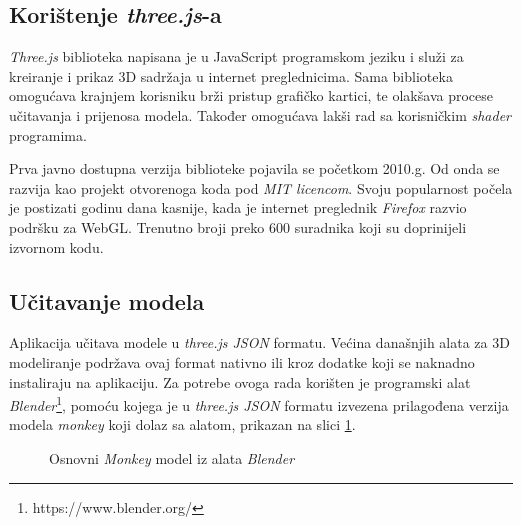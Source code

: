\subsection{Korištenje \emph{three.js}-a}

\emph{Three.js} \cite{threejs-github} biblioteka napisana je u JavaScript programskom jeziku i služi za kreiranje i prikaz 3D sadržaja u internet preglednicima. Sama biblioteka omogućava krajnjem korisniku brži pristup grafičko kartici, te olakšava procese učitavanja i prijenosa modela. Također omogućava lakši rad sa korisničkim \emph{shader} programima.

Prva javno dostupna verzija biblioteke pojavila se početkom 2010.g. Od onda se razvija kao projekt otvorenoga koda pod \emph{MIT licencom}. Svoju popularnost počela je postizati godinu dana kasnije, kada je internet preglednik \emph{Firefox} razvio podršku za WebGL. Trenutno broji preko 600 suradnika koji su doprinijeli izvornom kodu.

\subsection{Učitavanje modela}

Aplikacija učitava modele u \emph{three.js JSON} formatu. Većina današnjih alata za 3D modeliranje podržava ovaj format nativno ili kroz dodatke koji se naknadno instaliraju na aplikaciju. Za potrebe ovoga rada korišten je programski alat \emph{Blender}\footnote{https://www.blender.org/}, pomoću kojega je u \emph{three.js JSON} formatu izvezena prilagođena verzija modela \emph{monkey} koji dolaz sa alatom, prikazan na slici \ref{fig:blender-monkey}.

\begin{figure}[H]
\centering{}
\caption{Osnovni \emph{Monkey} model iz alata \emph{Blender}}
\label{fig:blender-monkey}
\end{figure}

